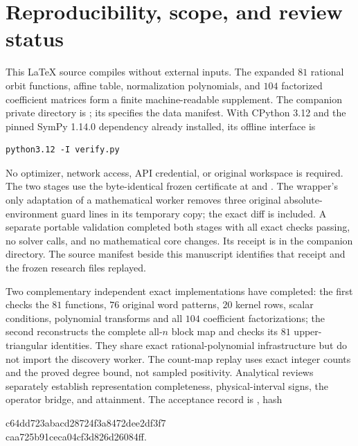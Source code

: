 \documentclass[11pt]{article}
\begin{document}
\section{Reproducibility, scope, and review status}\label{sec:record}
This \LaTeX{} source compiles without external inputs. The expanded
$81$ rational orbit functions, affine table, normalization polynomials,
and $104$ factorized coefficient matrices form a finite machine-readable
supplement. The companion private directory is
; its
 specifies the data manifest. With CPython 3.12 and the
pinned SymPy 1.14.0 dependency already installed, its offline interface is
\begin{verbatim}
python3.12 -I verify.py
\end{verbatim}
No optimizer, network access, API credential, or original workspace is
required. The two stages use the byte-identical frozen certificate at
 and
. The wrapper's only adaptation
of a mathematical worker removes three original absolute-environment
guard lines in its temporary copy; the exact diff is included.
A separate portable validation completed both stages with all exact checks
passing, no solver calls, and no mathematical core changes. Its receipt
is  in the companion
 directory.
The source manifest beside this manuscript identifies that receipt and
the frozen research files replayed.

Two complementary independent exact implementations have completed:
the first checks the $81$ functions, $76$ original word patterns,
$20$ kernel rows, scalar conditions, polynomial transforms and all
$104$ coefficient factorizations; the second reconstructs the complete
all-$n$ block map and checks its $81$ upper-triangular identities.
They share exact rational-polynomial infrastructure but do not import
the discovery worker. The count-map replay uses exact integer counts
and the proved degree bound, not sampled positivity. Analytical reviews
separately establish representation completeness, physical-interval
signs, the operator bridge, and attainment. The acceptance record is
, hash
\begin{center}\footnotesize\ttfamily
 c64dd723abacd28724f3a8472dee2df3f7\\
 caa725b91ceca04cf3d826d26084ff.
\end{center}
\end{document}
